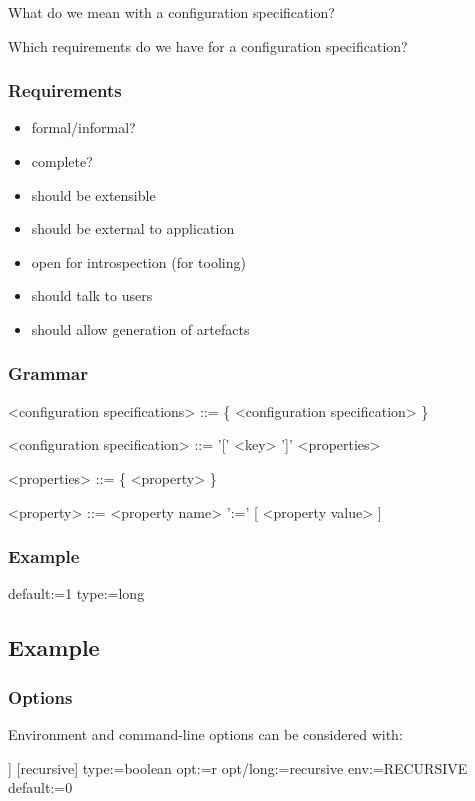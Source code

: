 \begin{assignment}
	\begin{task}
	What do we mean with a configuration specification?
	\end{task}

	\begin{task}
	Which requirements do we have for a configuration specification?
	\end{task}
\end{assignment}


\begin{frame}
	\frametitle{Requirements}

	\begin{itemize}
	\item formal/informal?
	\item complete?
	\pause
	\item should be extensible
	\item should be external to application
	\item open for introspection (for tooling)
	\item should talk to users
	\item should allow generation of artefacts
	\end{itemize}
\end{frame}


\begin{frame}[fragile]
	\frametitle{Grammar}
	\begin{grammar}
	<configuration specifications> ::= \{ <configuration specification> \}

	<configuration specification> ::= '[' <key> ']' <properties>

	<properties> ::= \{ <property> \}

	<property> ::= <property name> ':=' [ <property value> ]
	\end{grammar}
\end{frame}


\begin{frame}[fragile]
	\frametitle{Example}
	\begin{code}
	default:=1
	type:=long
	\end{code}
\end{frame}

\subsection{Example}

\begin{frame}[fragile]
	\frametitle{Options}

	Environment and command-line options can be considered with:

	\begin{code}[morekeywords={long},gobble=4]]
	[recursive]
	  type:=boolean
	  opt:=r
	  opt/long:=recursive
	  env:=RECURSIVE
	  default:=0
	\end{code}
\end{frame}

